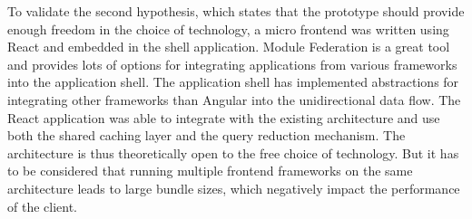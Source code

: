 \bigskip

\noindent To validate the second hypothesis, which states that the prototype should provide enough freedom in the choice of technology, a micro frontend was written using React and embedded in the shell application. Module Federation is a great tool and provides lots of options for integrating applications from various frameworks into the application shell. The application shell has implemented abstractions for integrating other frameworks than Angular into the unidirectional data flow. The React application was able to integrate with the existing architecture and use both the shared caching layer and the query reduction mechanism. The architecture is thus theoretically open to the free choice of technology. But it has to be considered that running multiple frontend frameworks on the same architecture leads to large bundle sizes, which negatively impact the performance of the client.
